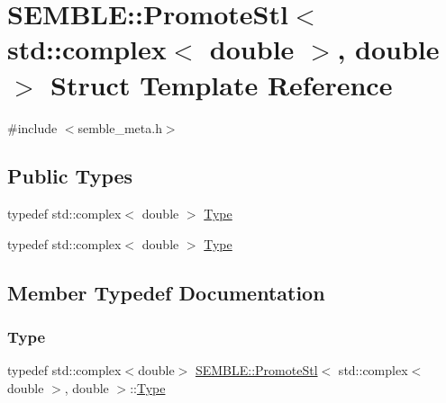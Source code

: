 \hypertarget{structSEMBLE_1_1PromoteStl_3_01std_1_1complex_3_01double_01_4_00_01double_01_4}{}\section{S\+E\+M\+B\+LE\+:\+:Promote\+Stl$<$ std\+:\+:complex$<$ double $>$, double $>$ Struct Template Reference}
\label{structSEMBLE_1_1PromoteStl_3_01std_1_1complex_3_01double_01_4_00_01double_01_4}


{\ttfamily \#include $<$semble\+\_\+meta.\+h$>$}

\subsection*{Public Types}
\begin{DoxyCompactItemize}
\item 
typedef std\+::complex$<$ double $>$ \mbox{\hyperlink{structSEMBLE_1_1PromoteStl_3_01std_1_1complex_3_01double_01_4_00_01double_01_4_acc3f8409c7950ecf0d488033807df399}{Type}}
\item 
typedef std\+::complex$<$ double $>$ \mbox{\hyperlink{structSEMBLE_1_1PromoteStl_3_01std_1_1complex_3_01double_01_4_00_01double_01_4_acc3f8409c7950ecf0d488033807df399}{Type}}
\end{DoxyCompactItemize}


\subsection{Member Typedef Documentation}
\mbox{\label{structSEMBLE_1_1PromoteStl_3_01std_1_1complex_3_01double_01_4_00_01double_01_4_acc3f8409c7950ecf0d488033807df399}} 
\subsubsection{\texorpdfstring{Type}{Type}\hspace{0.1cm}{\footnotesize\ttfamily [1/2]}}
{\footnotesize\ttfamily typedef std\+::complex$<$double$>$ \mbox{\hyperlink{structSEMBLE_1_1PromoteStl}{S\+E\+M\+B\+L\+E\+::\+Promote\+Stl}}$<$ std\+::complex$<$ double $>$, double $>$\+::\mbox{\hyperlink{structSEMBLE_1_1PromoteStl_3_01std_1_1complex_3_01double_01_4_00_01double_01_4_acc3f8409c7950ecf0d488033807df399}{Type}}}

